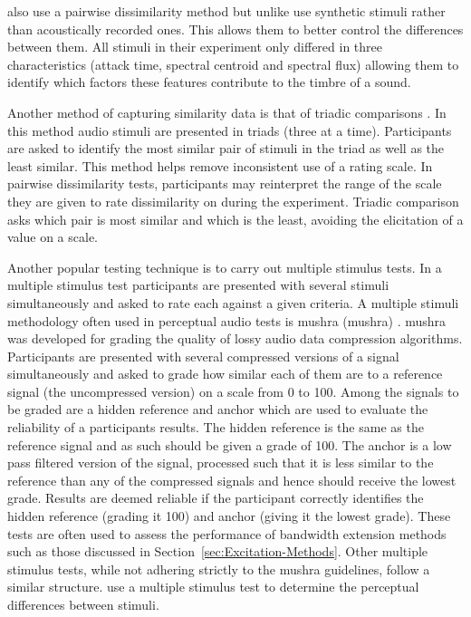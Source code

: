 			\citet{caclin2005acoustic} also use a pairwise dissimilarity method but unlike
			\citet{grey1977multidimensional} use synthetic stimuli rather than acoustically recorded ones. This
			allows them to better control the differences between them. All stimuli in their experiment only
			differed in three characteristics (attack time, spectral centroid and spectral flux) allowing them
			to identify which factors these features contribute to the timbre of a sound.

			Another method of capturing similarity data is that of triadic comparisons
			\citep{wickelmaier2007deriving}. In this method audio stimuli are presented in triads (three at a
			time). Participants are asked to identify the most similar pair of stimuli in the triad as well as
			the least similar. This method helps remove inconsistent use of a rating scale. In pairwise
			dissimilarity tests, participants may reinterpret the range of the scale they are given to rate
			dissimilarity on during the experiment. Triadic comparison asks which pair is most similar and
			which is the least, avoiding the elicitation of a value on a scale.

			Another popular testing technique is to carry out multiple stimulus tests. In a multiple stimulus
			test participants are presented with several stimuli simultaneously and asked to rate each against
			a given criteria. A multiple stimuli methodology often used in perceptual audio tests is
			\acrshort{mushra} (\acrlong{mushra}) \citep{mushra2014}. \acrshort{mushra} was developed for
			grading the quality of lossy audio data compression algorithms. Participants are presented with
			several compressed versions of a signal simultaneously and asked to grade how similar each of them
			are to a reference signal (the uncompressed version) on a scale from 0 to 100.  Among the signals
			to be graded are a hidden reference and anchor which are used to evaluate the reliability of a
			participants results. The hidden reference is the same as the reference signal and as such should
			be given a grade of 100. The anchor is a low pass filtered version of the signal, processed such
			that it is less similar to the reference than any of the compressed signals and hence should
			receive the lowest grade. Results are deemed reliable if the participant correctly identifies the
			hidden reference (grading it 100) and anchor (giving it the lowest grade). These tests are often
			used to assess the performance of bandwidth extension methods such as those discussed in
			Section~\ref{sec:Excitation-Methods}. Other multiple stimulus tests, while not adhering strictly to
			the \acrshort{mushra} guidelines, follow a similar structure.  \citet{arthi2015influence} use a
			multiple stimulus test to determine the perceptual differences between stimuli. 
			
